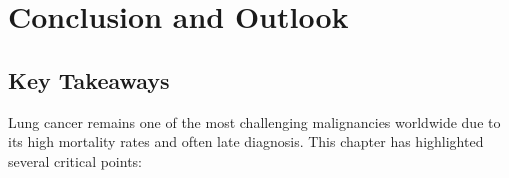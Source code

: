 
\section{Conclusion and Outlook}


\subsection{Key Takeaways}

Lung cancer remains one of the most challenging malignancies worldwide due to its high mortality 
rates and often late diagnosis. This chapter has highlighted several critical points:

